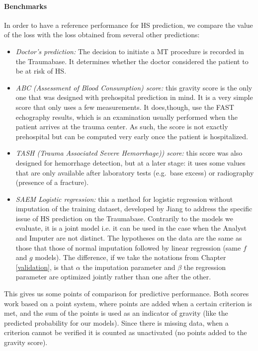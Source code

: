 \paragraph{Benchmarks}
In order to have a reference performance for HS prediction, we compare the value of the loss with the loss obtained from several other predictions:
\begin{itemize}
\item \emph{Doctor's prediction:} The decision to initiate a MT procedure is recorded in the Traumabase. It determines whether the doctor considered the patient to be at risk of HS.
\item \emph{ABC (Assessment of Blood Consumption)\cite{nunez2009ABC} score:} this gravity score is the only one that was designed with prehospital prediction in mind. It is a very simple score that only uses a few measurements. It does,though, use the FAST echography results, which is an examination usually performed when the patient arrives at the trauma center. As such, the score is not exactly prehospital but can be computed very early once the patient is hospitalized.
\item \emph{TASH (Trauma Associated Severe Hemorrhage)\cite{yucel2006tash}) score:} this score was also designed for hemorrhage detection, but at a later stage: it uses some values that are only available after laboratory tests (e.g.\ base excess) or radiography (presence of a fracture).
\item \emph{SAEM Logistic regression:} this a method for logistic regression without imputation of the training dataset, developed by Jiang \cite{jiangsaem} to address the specific issue of HS prediction on the Traumabase. Contrarily to the models we evaluate, it is a joint model i.e. it can be used in the case when the Analyst and Imputer are not distinct. The hypotheses on the data are the same as those that those of normal imputation followed by linear regression (same $f$ and $g$ models). The difference, if we take the notations from Chapter \ref{validation}, is that $\alpha$ the imputation parameter and $\beta$ the regression parameter are optimized jointly rather than one after the other. 
\end{itemize}

This gives us some points of comparison for predictive performance. Both scores work based on a point system, where points are added when a certain criterion is met, and the sum of the points is used as an indicator of gravity (like the predicted probability for our models). Since there is missing data, when a criterion cannot be verified it is counted as unactivated (no points added to the gravity score).

